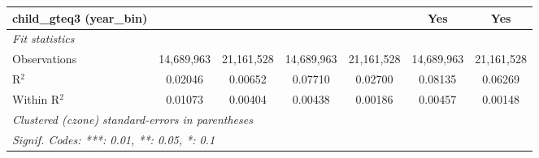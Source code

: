 \begin{tabular}{lcccccc}
child\_gteq3 (year\_bin) &  &  &  &  & Yes & Yes\\
\midrule \emph{Fit statistics}&  & & & & & \\
Observations & 14,689,963&21,161,528&14,689,963&21,161,528&14,689,963&21,161,528\\
R$^2$ & 0.02046&0.00652&0.07710&0.02700&0.08135&0.06269\\
Within R$^2$ & 0.01073&0.00404&0.00438&0.00186&0.00457&0.00148\\
\midrule\midrule\multicolumn{7}{l}{\emph{Clustered (czone) standard-errors in parentheses}}\\
\multicolumn{7}{l}{\emph{Signif. Codes: ***: 0.01, **: 0.05, *: 0.1}}\\
\end{tabular}



